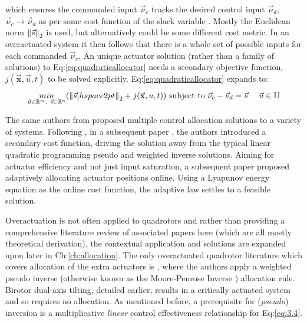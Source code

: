 which ensures the commanded input $\vec{\nu}_c$ tracks the desired control input $\vec{\nu}_d$,~$\vec{\nu}_c\rightarrow\vec{\nu}_d$ as per some cost function of the slack variable . Mostly the Euclidean norm $\left\lVert\vec{s}\right\rVert_2$ is used, but alternatively could be some different cost metric. In an overactuated system it then follows that there is a whole set of possible inputs for each commanded $\vec{\nu}_c$. An unique actuator solution (rather than a family of solutions) to Eq:\ref{eq:quadraticallocator} needs a secondary objective function, $j(\vec{\mathbf{x}},\vec{u},t)$ to be solved explicitly. Eq:\ref{eq:quadraticallocator} expands to:
\begin{equation} \label{eq:quadraticallocatorcost}
\underset{\vec{u} \in \mathbb{R}^m,~\vec{s} \in \mathbb{R}^n}{min}(\left\lVert\vec{s}]hspace{2pt}\right\rVert_2+j(\vec{\mathbf{x}},u,t)) ~\text{subject to} ~\vec{\nu}_c - \vec{\nu}_d=\vec{s}~~~~\vec{u} \in \mathbb{U}
\end{equation}
\par
The same authors from \cite{allocation,efficientallocation,adaptiveallocation} proposed multiple control allocation solutions to a variety of systems. Following \cite{allocation}, in a subsequent paper \cite{efficientallocation}, the authors introduced a secondary cost function, driving the solution away from the typical linear quadratic programming pseudo and weighted inverse solutions.  Aiming for actuator efficiency and not just input saturation, a subsequent paper \cite{adaptiveallocation} proposed adaptively allocating actuator positions online. Using a Lyapunov energy equation as the online cost function, the adaptive law settles to a feasible solution.
\par
Overactuation is not often applied to quadrotors and rather than providing a comprehensive literature review of associated papers here (which are all mostly theoretical derivation), the contextual application and solutions are expanded upon later in Ch:\ref{ch:allocation}. The only overactuated quadrotor literature which covers allocation of the extra actuators is \cite{tiltgasco,tiltrihani}, where the authors apply a weighted pseudo inverse (otherwise known as the Moore-Penrose Inverse \cite{moorepenrose}) allocation rule. Birotor dual-axis tilting, detailed earlier, results in a critically actuated system and so requires no allocation. As mentioned before, a prerequisite for (\emph{pseudo}) inversion is a multiplicative \emph{linear} control effectiveness relationship for Eq:\ref{eq:3.4}. 
\par
